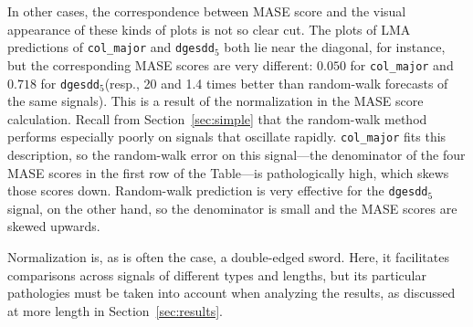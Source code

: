 \documentclass[%
pre,
reprint,
superscriptaddress,
showpacs,
nofootinbib,
nobibnotes,
 amsmath,amssymb,
 aps,
]{revtex4-1}
\newcommand{\gcc}{{\tt 403.gcc}\xspace}
\newcommand{\svdfive}{{\tt dgesdd$_5$}\xspace}
\newcommand{\col}{{\tt col\_major}\xspace}
\begin{document}
In other cases, the correspondence between MASE score and the visual
appearance of these kinds of plots is not so clear cut.  The plots of
LMA predictions of \col and \svdfive both lie near the diagonal, for
instance, but the corresponding MASE scores are very different:
$0.050$ for \col and $0.718$ for \svdfive (resp., 20 and 1.4 times
better than random-walk forecasts of the same signals).  This is a
result of the normalization in the MASE score calculation.  Recall
from Section~\ref{sec:simple} that the random-walk method performs
especially poorly on signals that oscillate rapidly.  \col fits this
description, so the random-walk error on this signal---the denominator
of the four MASE scores in the first row of the Table---is
pathologically high, which skews those scores down.  Random-walk
prediction is very effective for the \svdfive signal, on the other
hand, so the denominator is small and the MASE scores are skewed
upwards.

Normalization is, as is often the case, a double-edged sword.  Here,
it facilitates comparisons across signals of different types and
lengths, but its particular pathologies must be taken into account
when analyzing the results, as discussed at more length in
Section~\ref{sec:results}.


\end{document}
